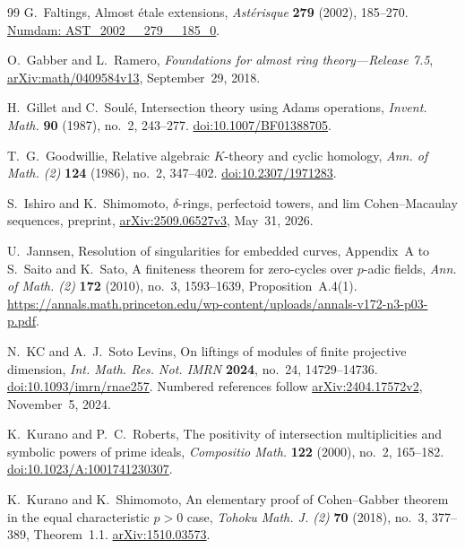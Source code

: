 \begin{thebibliography}{99}
G.~Faltings,
Almost \'etale extensions,
\emph{Ast\'erisque} \textbf{279} (2002), 185--270.
\href{https://numdam.org/item/AST_2002__279__185_0/}{Numdam: AST\_2002\_\_279\_\_185\_0}.

O.~Gabber and L.~Ramero,
\emph{Foundations for almost ring theory---Release 7.5},
\href{https://arxiv.org/abs/math/0409584v13}{arXiv:math/0409584v13},
September~29, 2018.

H.~Gillet and C.~Soul\'e,
Intersection theory using Adams operations,
\emph{Invent. Math.} \textbf{90} (1987), no.~2, 243--277.
\href{https://doi.org/10.1007/BF01388705}{doi:10.1007/BF01388705}.

T.~G.~Goodwillie,
Relative algebraic $K$-theory and cyclic homology,
\emph{Ann. of Math. (2)} \textbf{124} (1986), no.~2, 347--402.
\href{https://doi.org/10.2307/1971283}{doi:10.2307/1971283}.

S.~Ishiro and K.~Shimomoto,
$\delta$-rings, perfectoid towers, and lim Cohen--Macaulay sequences,
preprint,
\href{https://arxiv.org/abs/2509.06527v3}{arXiv:2509.06527v3},
May~31, 2026.

U.~Jannsen,
Resolution of singularities for embedded curves,
Appendix~A to S.~Saito and K.~Sato,
A finiteness theorem for zero-cycles over $p$-adic fields,
\emph{Ann. of Math. (2)} \textbf{172} (2010), no.~3, 1593--1639,
Proposition~A.4(1).
\url{https://annals.math.princeton.edu/wp-content/uploads/annals-v172-n3-p03-p.pdf}.

N.~KC and A.~J.~Soto Levins,
On liftings of modules of finite projective dimension,
\emph{Int. Math. Res. Not. IMRN} \textbf{2024}, no.~24, 14729--14736.
\href{https://doi.org/10.1093/imrn/rnae257}{doi:10.1093/imrn/rnae257}.
Numbered references follow
\href{https://arxiv.org/abs/2404.17572v2}{arXiv:2404.17572v2},
November~5, 2024.

K.~Kurano and P.~C.~Roberts,
The positivity of intersection multiplicities and symbolic powers of
prime ideals,
\emph{Compositio Math.} \textbf{122} (2000), no.~2, 165--182.
\href{https://doi.org/10.1023/A:1001741230307}{doi:10.1023/A:1001741230307}.

K.~Kurano and K.~Shimomoto,
An elementary proof of Cohen--Gabber theorem in the equal characteristic
$p>0$ case,
\emph{Tohoku Math. J. (2)} \textbf{70} (2018), no.~3, 377--389,
Theorem~1.1.
\href{https://arxiv.org/abs/1510.03573}{arXiv:1510.03573}.


\end{thebibliography}
